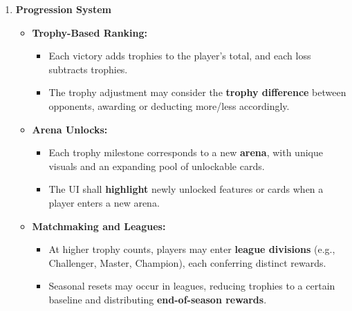 \documentclass{article}
\begin{document}
\begin{enumerate}[label=\textbf{FR\arabic*.}]
\item \textbf{Progression System}
\begin{itemize}
    \item \textbf{Trophy-Based Ranking:}
    \begin{itemize}
        \item Each victory adds trophies to the player's total, and each loss subtracts trophies.
        \item The trophy adjustment may consider the \textbf{trophy difference} between opponents, awarding or deducting more/less accordingly.
    \end{itemize}
    \item \textbf{Arena Unlocks:}
    \begin{itemize}
        \item Each trophy milestone corresponds to a new \textbf{arena}, with unique visuals and an expanding pool of unlockable cards.
        \item The UI shall \textbf{highlight} newly unlocked features or cards when a player enters a new arena.
    \end{itemize}
    \item \textbf{Matchmaking and Leagues:}
    \begin{itemize}
        \item At higher trophy counts, players may enter \textbf{league divisions} (e.g., Challenger, Master, Champion), each conferring distinct rewards.
        \item Seasonal resets may occur in leagues, reducing trophies to a certain baseline and distributing \textbf{end-of-season rewards}.
    \end{itemize}
\end{itemize}


\end{enumerate}
\end{document}
